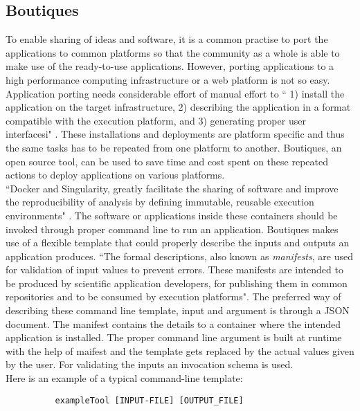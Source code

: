 \subsection{Boutiques}
To enable sharing of ideas and software, it is a common practise to port the applications to common platforms so that the community as a whole is able to make use of the ready-to-use applications. However, porting applications to a high performance computing infrastructure or a web platform is not so easy. Application porting needs considerable effort of manual effort to `` 1) install the application on the target infrastructure, 2) describing the application in a format compatible with the execution platform, and 3) generating proper user interfacesi" \cite{boutiques}. These installations and deployments are platform specific and thus the same tasks has to be repeated from one platform to another. Boutiques, an open source tool, can be used to save time and cost spent on these repeated actions to deploy applications on various platforms. \\

``Docker and Singularity, greatly facilitate the sharing of software and improve the reproducibility of analysis by defining immutable, reusable execution environments" \cite{boutiques}. The software or applications inside these containers should be invoked through proper command line to run an application. Boutiques makes use of a flexible template that could properly describe the inputs and outputs an application produces. ``The formal descriptions, also known as \textit{manifests}, are used for validation of input values to prevent errors. These manifests are intended to be produced by scientific application developers, for publishing them in common repositories and to be consumed by execution platforms". The preferred way of describing these command line template, input and argument is through a JSON document. The manifest contains the details to a container where the intended application is installed. The proper command line argument is built at runtime with the help of maifest and the template gets replaced by the actual values given by the user. For validating the inputs an invocation schema is used. \\

Here is an example of a typical command-line template:

\begin{verbatim}
          exampleTool [INPUT-FILE] [OUTPUT_FILE]
\end{verbatim}

